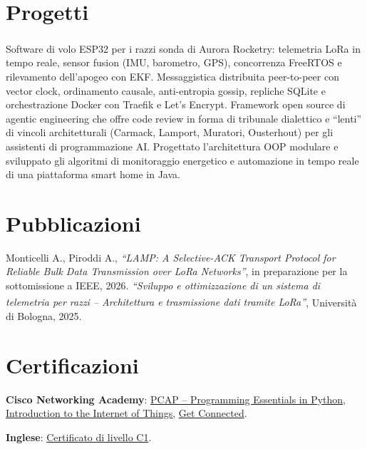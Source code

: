 \documentclass[letterpaper,11pt,italian]{article}
\begin{document}
\section{Progetti}
\resumeSubHeadingListStart
{}
{Software di volo ESP32 per i razzi sonda di Aurora Rocketry: telemetria LoRa\textsuperscript{\textcopyright} in tempo reale, sensor fusion (IMU, barometro, GPS), concorrenza FreeRTOS e rilevamento dell'apogeo con EKF.}
{Messaggistica distribuita peer-to-peer con vector clock, ordinamento causale, anti-entropia gossip, repliche SQLite e orchestrazione Docker con Traefik e Let's Encrypt.}
{Framework open source di agentic engineering che offre code review in forma di tribunale dialettico e ``lenti'' di vincoli architetturali (Carmack, Lamport, Muratori, Ousterhout) per gli assistenti di programmazione AI.}
{Progettato l'architettura OOP modulare e sviluppato gli algoritmi di monitoraggio energetico e automazione in tempo reale di una piattaforma smart home in Java.}
\resumeSubHeadingListEnd

\section{Pubblicazioni}
\resumeSubHeadingListStart
{}
{Monticelli A., Piroddi A., \textit{“LAMP: A Selective-ACK Transport Protocol for Reliable Bulk Data Transmission over LoRa Networks”}, in preparazione per la sottomissione a IEEE, 2026.}
{\textit{“Sviluppo e ottimizzazione di un sistema di telemetria per razzi – Architettura e trasmissione dati tramite LoRa\textsuperscript{\textcopyright}”}, Università di Bologna, 2025.}
\resumeSubHeadingListEnd

\section{Certificazioni}
\resumeSubHeadingListStart
\item \textbf{Cisco Networking Academy}{: \href{https://github.com/aleemont1/curriculum-vitae/blob/main/certificates/PYTHON-2020_certificate.pdf}{PCAP -- Programming Essentials in Python}, \href{https://github.com/aleemont1/curriculum-vitae/blob/main/certificates/IOT-2018_certificate.pdf}{Introduction to the Internet of Things}, \href{https://github.com/aleemont1/curriculum-vitae/blob/main/certificates/GetConnected-2017_certificate.pdf}{Get Connected}.}
\item \textbf{Inglese}{: \href{https://github.com/aleemont1/curriculum-vitae/blob/main/certificates/English_C1.pdf}{Certificato di livello C1}.}
\resumeSubHeadingListEnd
\cvsignatureblock
\end{document}
